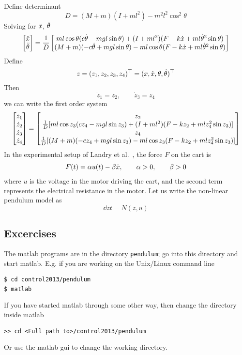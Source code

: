 \documentclass[12pt]{article}
\begin{document}
Define determinant
\[
D = (M+m)(I+ml^2) - m^2 l^2 \cos^2\theta
\]
Solving for $\ddot{x}$, $\ddot{\theta}$
\[
\begin{bmatrix}
\ddot{x} \\ \ddot{\theta} \end{bmatrix} = \frac{1}{D} \begin{bmatrix}
m l \cos\theta (c \dot{\theta} - mgl\sin\theta) + (I+ml^2)(F - k\dot{x} + ml\dot{\theta}^2 \sin\theta) \\
(M+m)(-c\dot{\theta} + mgl\sin\theta) - ml\cos\theta(F - k\dot{x} + ml\dot{\theta}^2 \sin\theta)
\end{bmatrix}
\]
Define
\[
z = (z_1, z_2, z_3, z_4)^\top = (x, \dot{x}, \theta, \dot{\theta})^\top
\]
Then
\[
\dot{z}_1 = z_2, \qquad \dot{z}_3 = z_4
\]
we can write the first order system
\[
\begin{bmatrix}
\dot{z}_1 \\ \dot{z}_2 \\ \dot{z}_3 \\ \dot{z}_4 \end{bmatrix} = \begin{bmatrix}
z_2 \\
\frac{1}{D} [ m l \cos z_3 (c z_4 - mgl\sin z_3) + (I+ml^2)(F - k z_2 + ml z_4^2 \sin      z_3)] \\
z_4 \\
\frac{1}{D}[ (M+m)(-c z_4 + mgl\sin z_3) - ml\cos z_3 (F - k z_2 + ml z_4^2 \sin z_3)]
\end{bmatrix}
\]
In the experimental setup of Landry et al.~\cite{landry}, the force $F$ on the cart is
\[
F(t) = \alpha u(t) - \beta \dot{x}, \qquad \alpha > 0, \qquad \beta > 0
\]
where $u$ is the voltage in the motor driving the cart, and the second term represents the electrical resistance in the motor. Let us write the non-linear pendulum model as
\[
\dd{z}{t} = N(z,u)
\]
\subsection{Excercises}
The matlab programs are in the directory {\tt pendulum}; go into this directory and start matlab. E.g. if you are working on the Unix/Linux command line
\begin{lstlisting}
$ cd control2013/pendulum
$ matlab
\end{lstlisting}
If you have started matlab through some other way, then change the directory inside matlab
\begin{lstlisting}
>> cd <Full path to>/control2013/pendulum
\end{lstlisting}
Or use the matlab gui to change the working directory.
\end{document}
